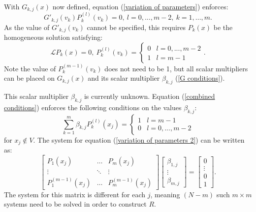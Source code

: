 \documentclass{book}
\begin{document}
With $G_{k,j}(x)$ now defined, equation (\ref{variation of parameters}) enforces:
\begin{equation}
G'_{k,j}(v_k) P_k^{(l)}(v_k) = 0, \ l = 0,...,m-2, \ k = 1,...,m .
\end{equation}
As the value of $G'_{k,j}(v_k)$ cannot be specified, this requires $P_k(x)$ be the homogeneous solution satisfying: %
\begin{equation} \label{homog solns}
\mathcal{L}P_k(x) = 0, \ P_k^{(l)}(v_k) = \begin{cases} 0 & l = 0,...,m-2 \\ 1 & l = m-1 \end{cases} .
\end{equation}
Note the value of $P_k^{(m-1)}(v_k)$ does not need to be 1, but all scalar multipliers can be placed on $G_{k,j}(x)$ and its scalar multiplier $\beta_{k,j}$ (\ref{G conditions}).

This scalar multiplier $\beta_{k,j}$ is currently unknown.
Equation (\ref{combined conditions}) enforces the following conditions on the values $\beta_{k,j}$:
\begin{equation} \label{variation of parameters 2}
\sum_{k=1}^m \beta_{k,j} P_k^{(l)}(x_j) = \begin{cases} 1 & l = m-1 \\ 0 & l =0,...,m-2 \end{cases}
\end{equation}
for $x_j \notin V$.
The system for equation (\ref{variation of parameters 2}) can be written as:
\begin{equation} \label{eq:betas}
\begin{bmatrix} P_1(x_j) & \dots & P_m(x_j)
\\ \vdots & \ddots & \vdots
\\ P_1^{(m-1)}(x_j) & \dots & P_m^{(m-1)}(x_j) \end{bmatrix}
\begin{bmatrix} \beta_{1,j} \\ \vdots \\ \beta_{m,j} \end{bmatrix} =
\begin{bmatrix} 0 \\ \vdots \\ 0 \\ 1 \end{bmatrix} .
\end{equation}
The system for this matrix is different for each $j$, meaning $(N - m)$ such $m \times m$ systems need to be solved in order to construct $R$.
\end{document}
